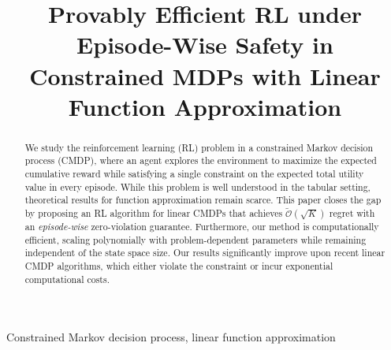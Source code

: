 \documentclass[vlined,cleveref,final,12pt]{colt2025} %
\title[Provably Efficient RL under Episode-Wise Safety in Linear CMDPs]
{Provably Efficient RL under Episode-Wise Safety in\\ Constrained MDPs with Linear Function Approximation}
\begin{document}
\maketitle

\vspace{-1cm}
\begin{abstract}%
We study the reinforcement learning (RL) problem in a constrained Markov decision process (CMDP), where an agent explores the environment to maximize the expected cumulative reward while satisfying a single constraint on the expected total utility value in every episode. While this problem is well understood in the tabular setting, theoretical results for function approximation remain scarce. This paper closes the gap by proposing an RL algorithm for linear CMDPs that achieves $\widetilde{\mathcal{O}}(\sqrt{K})$ regret with an {\em episode-wise} zero-violation guarantee. Furthermore, our method is computationally efficient, scaling polynomially with problem-dependent parameters while remaining independent of the state space size. Our results significantly improve upon recent linear CMDP algorithms, which either violate the constraint or incur exponential computational costs.
\end{abstract}

\begin{keywords}%
Constrained Markov decision process, linear function approximation%
\end{keywords}










\newpage
\appendix

\tableofcontents
\newpage






\end{document}
